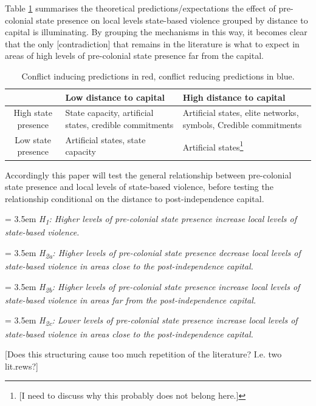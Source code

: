 \documentclass[12pt]{article}
\begin{document}
Table \ref{twoXtwo} summarises the theoretical predictions/expectations the
effect of pre-colonial state presence on local levels state-based violence
grouped by distance to capital is illuminating. By grouping the mechanisms in
this way, it becomes clear that the only [contradiction] that remains in the
literature is what to expect in areas of high levels of pre-colonial state
presence far from the capital. 

\begin{table}
\begin{tabularx}{\textwidth} { c | X | X }
	& Low distance to capital & High distance to capital \\ \hline
	High state presence & {\color{blue} State capacity, artificial states,
		credible commitments} & {\color{red} Artificial states, elite
			networks, symbols}, {\color{blue} Credible
				commitments} \\ \hline
	Low state presence & \color{red} Artificial states, state capacity &
		\color{red} Artificial states\footnote{[I need to discuss why
		this probably does not belong here.]}
\end{tabularx}
\caption{Conflict inducing predictions in {\color{red}red}, conflict reducing
predictions in {\color{blue}blue}.}
\label{twoXtwo}
\end{table}
	
Accordingly this paper will test the general relationship between pre-colonial
state presence and local levels of state-based violence, before testing the
relationship conditional on the distance to post-independence capital.

\bigskip
\hangindent = 3.5em \textit{H\textsubscript{1}: Higher levels of pre-colonial
	state presence increase local levels of state-based violence.}

\bigskip
\hangindent = 3.5em \textit{H\textsubscript{2a}: Higher levels of pre-colonial
	state presence decrease local levels of state-based violence in areas
	close to the post-independence capital.}

\bigskip
\hangindent = 3.5em \textit{H\textsubscript{2b}: Higher levels of pre-colonial
	state presence increase local levels of state-based violence in areas
	far from the post-independence capital.}

\bigskip
\hangindent = 3.5em \textit{H\textsubscript{2c}: Lower levels of pre-colonial
	state presence increase local levels of state-based violence in areas
	close to the post-independence capital.}

[Does this structuring cause too much repetition of the literature? I.e. two
lit.rews?] 
\end{document}
